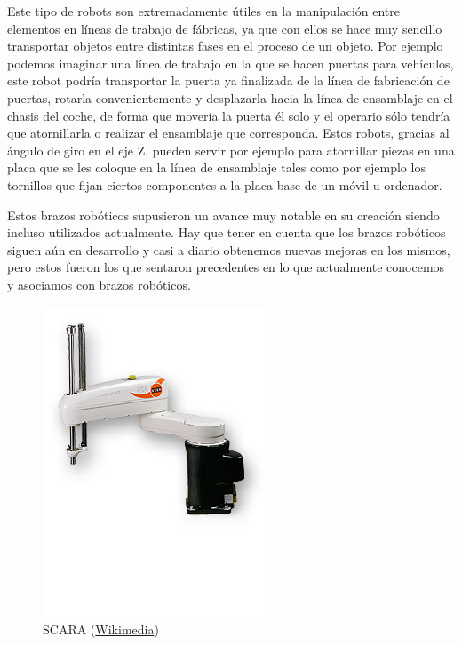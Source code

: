 Este tipo de robots son extremadamente útiles en la manipulación entre elementos en líneas de trabajo de fábricas, ya que con ellos se hace muy sencillo transportar objetos entre distintas fases en el proceso de un objeto. Por ejemplo podemos imaginar una línea de trabajo en la que se hacen puertas para vehículos, este robot podría transportar la puerta ya finalizada de la línea de fabricación de puertas, rotarla convenientemente y desplazarla hacia la línea de ensamblaje en el chasis del coche, de forma que movería la puerta él solo y el operario sólo tendría que atornillarla o realizar el ensamblaje que corresponda. Estos robots, gracias al ángulo de giro en el eje Z, pueden servir por ejemplo para atornillar piezas en una placa que se les coloque en la línea de ensamblaje tales como por ejemplo los tornillos que fijan ciertos componentes a la placa base de un móvil u ordenador.

Estos brazos robóticos supusieron un avance muy notable en su creación siendo incluso utilizados actualmente. Hay que tener en cuenta que los brazos robóticos siguen aún en desarrollo y casi a diario obtenemos nuevas mejoras en los mismos, pero estos fueron los que sentaron precedentes en lo que actualmente conocemos y asociamos con brazos robóticos.

\begin{figure}[!h]
	\centering
	\includegraphics[scale=0.5]{./EtapaModerna/Imagenes/SCARA.jpg}
	\caption{SCARA (\href{https://commons.wikimedia.org/wiki/File:KUKA_Industrial_Robot_KR10_SCARA.jpg}{Wikimedia})}
	\label{fig:scara}
\end{figure}
